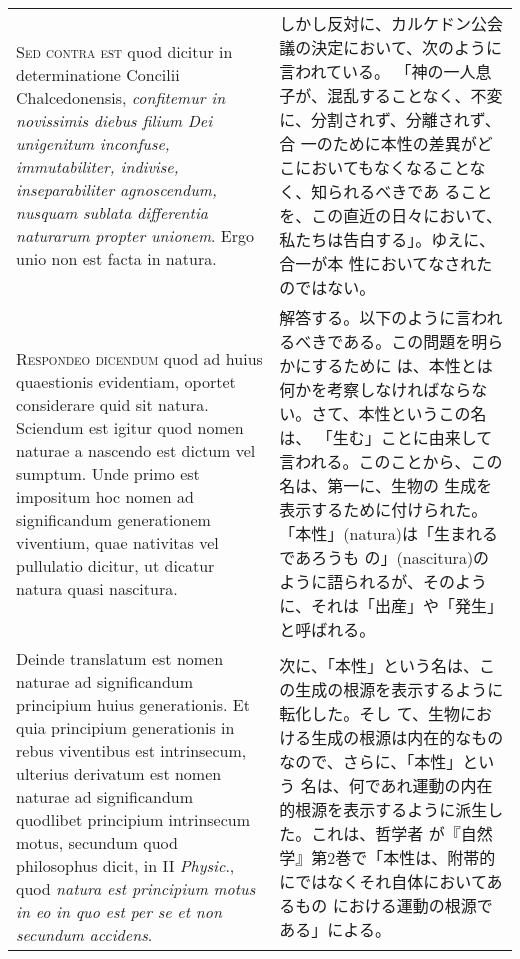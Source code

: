 \documentclass[10pt]{jsarticle} %
\begin{document}
\begin{longtable}{p{21em}p{21em}}
\\



{\scshape Sed contra est} quod dicitur in determinatione Concilii
Chalcedonensis, {\itshape confitemur in novissimis diebus filium Dei
unigenitum inconfuse, immutabiliter, indivise, inseparabiliter
agnoscendum, nusquam sublata differentia naturarum propter
unionem}. Ergo unio non est facta in natura.


&

しかし反対に、カルケドン公会議の決定において、次のように言われている。
「神の一人息子が、混乱することなく、不変に、分割されず、分離されず、合
一のために本性の差異がどこにおいてもなくなることなく、知られるべきであ
ることを、この直近の日々において、私たちは告白する」。ゆえに、合一が本
性においてなされたのではない。



\\

{\scshape Respondeo dicendum} quod ad huius quaestionis evidentiam,
oportet considerare quid sit natura. Sciendum est igitur quod nomen
naturae a nascendo est dictum vel sumptum. Unde primo est impositum
hoc nomen ad significandum generationem viventium, quae nativitas vel
pullulatio dicitur, ut dicatur natura quasi nascitura.

&

解答する。以下のように言われるべきである。この問題を明らかにするために
は、本性とは何かを考察しなければならない。さて、本性というこの名は、
「生む」ことに由来して言われる。このことから、この名は、第一に、生物の
生成を表示するために付けられた。「本性」(natura)は「生まれるであろうも
の」(nascitura)のように語られるが、そのように、それは「出産」や「発生」
と呼ばれる。


\\


Deinde translatum est nomen naturae ad significandum principium huius
generationis. Et quia principium generationis in rebus viventibus est
intrinsecum, ulterius derivatum est nomen naturae ad significandum
quodlibet principium intrinsecum motus, secundum quod philosophus
dicit, in II {\itshape Physic}., quod {\itshape natura est principium
motus in eo in quo est per se et non secundum accidens}.


&

次に、「本性」という名は、この生成の根源を表示するように転化した。そし
て、生物における生成の根源は内在的なものなので、さらに、「本性」という
名は、何であれ運動の内在的根源を表示するように派生した。これは、哲学者
が『自然学』第2巻で「本性は、附帯的にではなくそれ自体においてあるもの
における運動の根源である」による。



\end{longtable}
\end{document}
